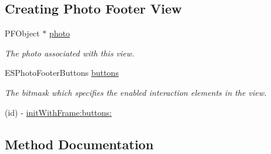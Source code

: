\subsection*{Creating Photo Footer View}
\begin{DoxyCompactItemize}
\item 
\hypertarget{interface_e_s_photo_footer_view_a114fe2ca91f9008d1af16bdbfe19b48b}{}P\+F\+Object $\ast$ \hyperlink{interface_e_s_photo_footer_view_a114fe2ca91f9008d1af16bdbfe19b48b}{photo}\label{interface_e_s_photo_footer_view_a114fe2ca91f9008d1af16bdbfe19b48b}

\begin{DoxyCompactList}\small\item\em The photo associated with this view. \end{DoxyCompactList}\item 
\hypertarget{interface_e_s_photo_footer_view_a54c2e84d720dafd6a20fc12488a4e14b}{}E\+S\+Photo\+Footer\+Buttons \hyperlink{interface_e_s_photo_footer_view_a54c2e84d720dafd6a20fc12488a4e14b}{buttons}\label{interface_e_s_photo_footer_view_a54c2e84d720dafd6a20fc12488a4e14b}

\begin{DoxyCompactList}\small\item\em The bitmask which specifies the enabled interaction elements in the view. \end{DoxyCompactList}\item 
(id) -\/ \hyperlink{interface_e_s_photo_footer_view_a8f5e5516030035cb09e7224532cc2670}{init\+With\+Frame\+:buttons\+:}
\end{DoxyCompactItemize}


\subsection{Method Documentation}
\hypertarget{interface_e_s_photo_footer_view_a8f5e5516030035cb09e7224532cc2670}{}

